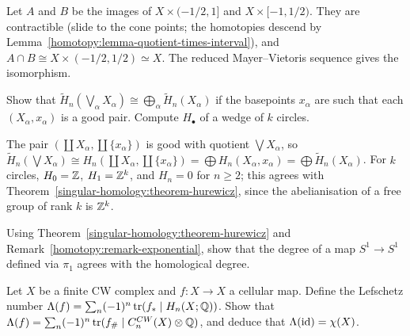 \begin{solution}
Let $A$ and $B$ be the images of $X \times (-1/2, 1]$ and $X \times [-1, 1/2)$. They are contractible (slide to the cone points; the homotopies descend by
Lemma~\ref{homotopy:lemma-quotient-times-interval}), and $A \cap B \cong X \times (-1/2, 1/2) \simeq X$. The reduced Mayer--Vietoris sequence gives the isomorphism.
\end{solution}

\begin{exercise}\label{singular-homology:exercise-wedge}
Show that $\tilde{H}_n(\bigvee_\alpha X_\alpha) \cong \bigoplus_\alpha\tilde{H}_n(X_\alpha)$ if the basepoints $x_\alpha$ are such that each $(X_\alpha, x_\alpha)$ is a good pair.
Compute $H_\bullet$ of a wedge of $k$ circles.
\end{exercise}

\begin{solution}
The pair $(\coprod X_\alpha, \coprod\{x_\alpha\})$ is good with quotient $\bigvee X_\alpha$, so
$\tilde{H}_n(\bigvee X_\alpha) \cong H_n(\coprod X_\alpha, \coprod\{x_\alpha\}) = \bigoplus H_n(X_\alpha, x_\alpha) = \bigoplus\tilde{H}_n(X_\alpha)$. For $k$ circles, $H_0 = \mathbb{Z}$, $H_1 = \mathbb{Z}^k$,
and $H_n = 0$ for $n \geq 2$; this agrees with Theorem~\ref{singular-homology:theorem-hurewicz}, since the abelianisation of a free group of rank $k$ is $\mathbb{Z}^k$.
\end{solution}

\begin{exercise}\label{singular-homology:exercise-degree-comparison}
Using Theorem~\ref{singular-homology:theorem-hurewicz} and Remark~\ref{homotopy:remark-exponential}, show that the degree of a map $S^1 \to S^1$ defined via $\pi_1$
agrees with the homological degree.
\end{exercise}

\begin{exercise}\label{singular-homology:exercise-lefschetz}
Let $X$ be a finite CW complex and $f \colon X \to X$ a cellular map. Define the Lefschetz number $\Lambda(f) = \sum_n(-1)^n\operatorname{tr}(f_* \mid H_n(X; \mathbb{Q}))$. Show that
$\Lambda(f) = \sum_n (-1)^n \operatorname{tr}(f_\# \mid C^{CW}_n(X) \otimes \mathbb{Q})$, and deduce that $\Lambda(\mathrm{id}) = \chi(X)$.
\end{exercise}

